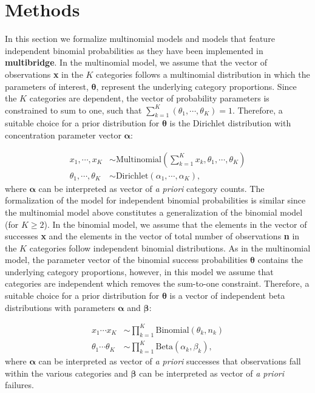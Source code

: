 \documentclass[
  english,
  man,floatsintext]{apa6}
\begin{document}
\hypertarget{methods}{%
\section{Methods}\label{methods}}

\noindent In this section we formalize multinomial models and models that feature independent binomial probabilities as they have been implemented in \textbf{multibridge}. In the multinomial model, we assume that the vector of observations \textbf{x} in the \(K\) categories follows a multinomial distribution in which the parameters of interest, \(\boldsymbol{\theta}\), represent the underlying category proportions. Since the \(K\) categories are dependent, the vector of probability parameters is constrained to sum to one, such that \(\sum_{k = 1}^K (\theta_1, \cdots, \theta_K) = 1\). Therefore, a suitable choice for a prior distribution for \(\boldsymbol{\theta}\) is the Dirichlet distribution with concentration parameter vector \(\boldsymbol{\alpha}\):

\begin{align}
  x_1, \cdots, x_K &\sim \text{Multinomial}(\sum_{k = 1}^K x_k, \theta_1, \cdots, \theta_K) \\
  \theta_1, \cdots, \theta_K &\sim \text{Dirichlet}(\alpha_1, \cdots, \alpha_K),
\end{align}
where \(\boldsymbol{\alpha}\) can be interpreted as vector of \emph{a priori} category counts. The formalization of the model for independent binomial probabilities is similar since the multinomial model above constitutes a generalization of the binomial model (for \(K \geq 2\)). In the binomial model, we assume that the elements in the vector of successes \textbf{x} and the elements in the vector of total number of observations \textbf{n} in the \(K\) categories follow independent binomial distributions. As in the multinomial model, the parameter vector of the binomial success probabilities \(\boldsymbol{\theta}\) contains the underlying category proportions, however, in this model we assume that categories are independent which removes the sum-to-one constraint. Therefore, a suitable choice for a prior distribution for \(\boldsymbol{\theta}\) is a vector of independent beta distributions with parameters \(\boldsymbol{\alpha}\) and \(\boldsymbol{\beta}\):

\begin{align}
  x_1 \cdots x_K & \sim \prod_{k = 1}^K \text{Binomial}(\theta_k, n_k) \\
  \theta_1 \cdots \theta_K &\sim \prod_{k = 1}^K \text{Beta}(\alpha_k, \beta_k),
\end{align}
where \(\boldsymbol{\alpha}\) can be interpreted as vector of \emph{a priori} successes that observations fall within the various categories and \(\boldsymbol{\beta}\) can be interpreted as vector of \emph{a priori} failures.
\end{document}
